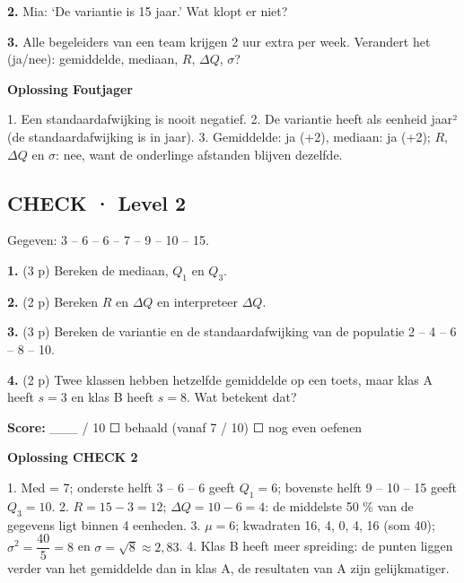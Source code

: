 \textbf{2.} Mia: ‘De variantie is 15 jaar.’ Wat klopt er niet? \lijn

\textbf{3.} Alle begeleiders van een team krijgen 2 uur extra per week. Verandert het (ja/nee): gemiddelde, mediaan, $R$, $\Delta Q$, $\sigma$? \lijn

\begin{oplossing}
\textbf{Oplossing Foutjager}

1. Een standaardafwijking is nooit negatief. 2. De variantie heeft als eenheid jaar² (de standaardafwijking is in jaar). 3. Gemiddelde: ja (+2), mediaan: ja (+2); $R$, $\Delta Q$ en $\sigma$: nee, want de onderlinge afstanden blijven dezelfde.
\end{oplossing}

\subsection*{CHECK · Level 2}

Gegeven: 3 – 6 – 6 – 7 – 9 – 10 – 15.

\textbf{1.} (3 p) Bereken de mediaan, $Q_1$ en $Q_3$. \lijn

\textbf{2.} (2 p) Bereken $R$ en $\Delta Q$ en interpreteer $\Delta Q$. \lijn

\textbf{3.} (3 p) Bereken de variantie en de standaardafwijking van de populatie 2 – 4 – 6 – 8 – 10. \lijn

\textbf{4.} (2 p) Twee klassen hebben hetzelfde gemiddelde op een toets, maar klas A heeft $s=3$ en klas B heeft $s=8$. Wat betekent dat? \lijn

\begin{doel}
\textbf{Score:} \_\_\_ / 10 \quad ☐ behaald (vanaf 7 / 10) \quad ☐ nog even oefenen
\end{doel}

\begin{oplossing}
\textbf{Oplossing CHECK 2}

1. Med = 7; onderste helft 3 – 6 – 6 geeft $Q_1=6$; bovenste helft 9 – 10 – 15 geeft $Q_3=10$. 2. $R=15-3=12$; $\Delta Q=10-6=4$: de middelste 50 \% van de gegevens ligt binnen 4 eenheden. 3. $\mu=6$; kwadraten 16, 4, 0, 4, 16 (som 40); $\sigma^2=\dfrac{40}{5}=8$ en $\sigma=\sqrt{8}\approx 2{,}83$. 4. Klas B heeft meer spreiding: de punten liggen verder van het gemiddelde dan in klas A, de resultaten van A zijn gelijkmatiger.
\end{oplossing}
